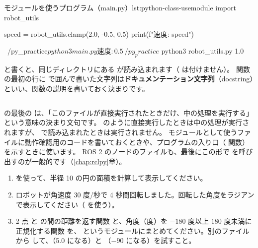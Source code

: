 \begin{codelisting}[style=python]{モジュールを使うプログラム（main.py）}{lst:python-class-usemodule}
import robot_utils

speed = robot_utils.clamp(2.0, -0.5, 0.5)
print(f"速度: {speed}")
\end{codelisting}

\begin{terminal}[自分で作ったモジュールを使う]
~/py_practice$ python3 main.py
速度: 0.5
~/py_practice$ python3 robot_utils.py
1.0
\end{terminal}

 と書くと、同じディレクトリにある  が読み込まれます（ は付けません）。
関数の最初の行に  で囲んで書いた文字列は\textbf{ドキュメンテーション文字列}（docstring）といい、関数の説明を書いておく決まりです。

\subsection{}

 の最後の  は、「このファイルが直接実行されたときだけ、中の処理を実行する」という意味の決まり文句です。
 のように直接実行したときは中の処理が実行されますが、 で読み込まれたときは実行されません。
モジュールとして使うファイルに動作確認用のコードを書いておくときや、プログラムの入り口（ 関数）を示すときに使います。
ROS 2 のノードのファイルも、最後にこの形で  を呼び出すのが一般的です（\ref{chap:rclpy}章）。

\begin{exercise}
\begin{enumerate}
  \item {} を使って、半径 10 の円の面積を計算して表示してください。
  \item ロボットが角速度 30 度/秒で 4 秒間回転しました。回転した角度をラジアンで表示してください（ を使う）。
  \item 2 点  と  の間の距離を返す関数  と、角度（度）を $-180$ 度以上 $180$ 度未満に正規化する関数  を、 というモジュールにまとめてください。別のファイルから  して、（5.0 になる）と （$-90$ になる）を試すこと。
\end{enumerate}
\end{exercise}

